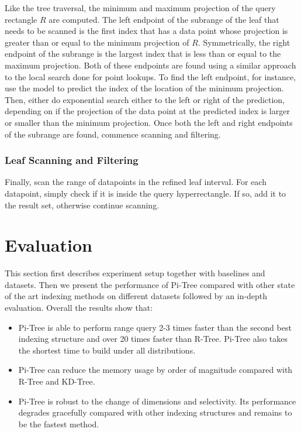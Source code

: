 \documentclass[sigconf,10pt]{acmart}
\begin{document}
Like the tree traversal, the minimum and maximum projection of the query 
rectangle $R$ are computed. 
The left endpoint of the subrange of the leaf that needs to be scanned
is the first index that has a data point whose projection is greater than or equal to the minimum
projection of $R$. Symmetrically, the right endpoint of the subrange is the 
largest index that is less than or equal to the maximum projection.
Both of these endpoints are found using a similar approach to the local
search done for point lookups. To find the left endpoint, for instance,
use the model to predict the index of the location of the minimum projection.
Then, either do exponential search either to the left or right of the prediction,
depending on if the projection of the data point at the predicted index is
larger or smaller than the minimum projection. Once both the left
and right endpoints of the subrange are found, commence scanning and filtering.

\subsubsection{Leaf Scanning and Filtering}

Finally, scan the range of datapoints in the refined leaf interval.
For each datapoint, simply check if it is inside the query hyperrectangle.
If so, add it to the result set, otherwise continue scanning.

\section{Evaluation}

This section first describes experiment setup together with baselines and datasets. 
Then we present the performance of Pi-Tree compared with other state of the art 
indexing methods on different datasets followed by an in-depth evaluation. 
Overall the results show that:
\begin{itemize}
    \item Pi-Tree is able to perform range query 2-3 times faster than the second
    best indexing structure and over 20 times faster than R-Tree. Pi-Tree also takes
    the shortest time to build under all distributions.
    \item Pi-Tree can reduce the memory usage by order of magnitude compared with
    R-Tree and KD-Tree.
    \item Pi-Tree is robust to the change of dimensions and selectivity. Its performance
    degrades gracefully compared with other indexing structures and remains to be
    the fastest method.
\end{itemize}
\end{document}
